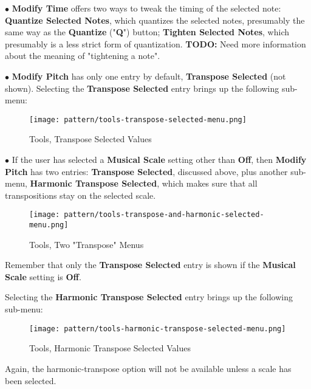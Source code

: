    $\bullet$ \textbf{Modify Time} offers two ways to tweak the timing of the
   selected note:
   \textbf{Quantize Selected Notes}, which quantizes the selected
   notes, presumably the same way as the \textbf{Quantize} ("\textbf{Q}")
   button; \textbf{Tighten Selected Notes}, which presumably is a less
   strict form of quantization.
   \textbf{TODO:}
   Need more information about the meaning of "tightening a note".

   $\bullet$ \textbf{Modify Pitch} has only one entry by default,
   \textbf{Transpose Selected} (not shown).
   Selecting the \textbf{Transpose Selected} entry
   brings up the following sub-menu:

\begin{figure}[H]
   \centering 
   \texttt{[image: pattern/tools-transpose-selected-menu.png]}
   \caption{Tools, Transpose Selected Values}
   \label{fig:pattern_editor_tools_transpose_selected_menu}
\end{figure}

   $\bullet$ If the user has selected a
   \textbf{Musical Scale} setting other than \textbf{Off},
   then \textbf{Modify Pitch} has two entries:
   \textbf{Transpose Selected}, discussed above, plus
   another sub-menu,
   \textbf{Harmonic Transpose Selected}, which makes sure that all
   transpositions stay on the selected scale.

\begin{figure}[H]
   \centering 
   \texttt{[image: pattern/tools-transpose-and-harmonic-selected-menu.png]}
   \caption{Tools, Two "Transpose" Menus}
   \label{fig:pattern_editor_tools_two_transpose_menus}
\end{figure}

   Remember that only the \textbf{Transpose Selected} entry is shown if the
   \textbf{Musical Scale} setting is \textbf{Off}.

   Selecting the \textbf{Harmonic Transpose Selected} entry brings up the
   following sub-menu:

\begin{figure}[H]
   \centering 
   \texttt{[image: pattern/tools-harmonic-transpose-selected-menu.png]}
   \caption{Tools, Harmonic Transpose Selected Values}
   \label{fig:pattern_editor_tools_harmonic_transpose_menu}
\end{figure}

   Again, the harmonic-transpose option will not be available unless a scale
   has been selected.

